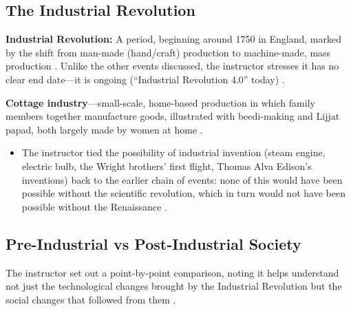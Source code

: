 \subsection{The Industrial Revolution}

\begin{KeyConcept}
\textbf{Industrial Revolution:} A period, beginning around 1750 in England, marked by the shift from man-made (hand/craft) production to machine-made, mass production . Unlike the other events discussed, the instructor stresses it has no clear end date---it is ongoing (``Industrial Revolution 4.0'' today) .

\textbf{Cottage industry}---small-scale, home-based production in which family members together manufacture goods, illustrated with beedi-making and Lijjat papad, both largely made by women at home .
\begin{itemize}
    \item The instructor tied the possibility of industrial invention (steam engine, electric bulb, the Wright brothers' first flight, Thomas Alva Edison's inventions) back to the earlier chain of events: none of this would have been possible without the scientific revolution, which in turn would not have been possible without the Renaissance .
\end{itemize}
\end{KeyConcept}

\subsection{Pre-Industrial vs Post-Industrial Society}
The instructor set out a point-by-point comparison, noting it helps understand not just the technological changes brought by the Industrial Revolution but the social changes that followed from them .

